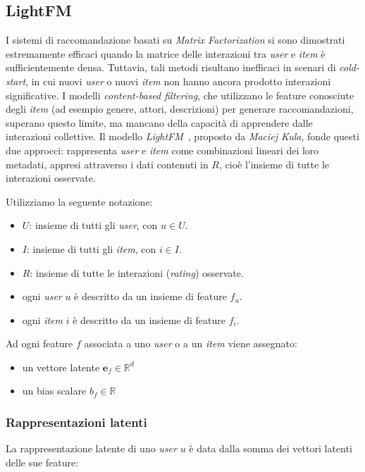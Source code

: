 \subsection{LightFM}\label{lightfm}

I sistemi di raccomandazione basati su \textit{Matrix Factorization} si sono dimostrati estremamente efficaci quando la matrice delle interazioni tra \textit{user} e \textit{item} è sufficientemente densa. Tuttavia, tali metodi risultano inefficaci in scenari di \textit{cold-start}, in cui nuovi \textit{user} o nuovi \textit{item} non hanno ancora prodotto interazioni significative. I modelli \textit{content-based filtering}, che utilizzano le feature conosciute degli \textit{item} (ad esempio genere, attori, descrizioni) per generare raccomandazioni, superano questo limite, ma mancano della capacità di apprendere dalle interazioni collettive. Il modello \textit{LightFM}~\cite{LightFM}, proposto da \textit{Maciej Kula}, fonde questi due approcci: rappresenta \textit{user} e \textit{item} come combinazioni lineari dei loro metadati, appresi attraverso i dati contenuti in $R$, cioè l'insieme di tutte le interazioni osservate.

Utilizziamo la seguente notazione:
\begin{itemize}
    \item $U$: insieme di tutti gli \textit{user}, con $u \in U$.
    \item $I$: insieme di tutti gli \textit{item}, con $i \in I$.
    \item $R$: insieme di tutte le interazioni (\textit{rating}) osservate.
    \item ogni \textit{user} $u$ è descritto da un insieme di feature $f_u$.
    \item ogni \textit{item} $i$ è descritto da un insieme di feature $f_i$.
\end{itemize}

Ad ogni feature $f$ associata a uno \textit{user} o a un \textit{item} viene assegnato:
\begin{itemize}
    \item un vettore latente $\mathbf{e}_f \in \mathbb{R}^d$
    \item un bias scalare $b_f \in \mathbb{R}$
\end{itemize}

\subsubsection{Rappresentazioni latenti}
La rappresentazione latente di uno \textit{user} $u$ è data dalla somma dei vettori latenti delle sue feature:


